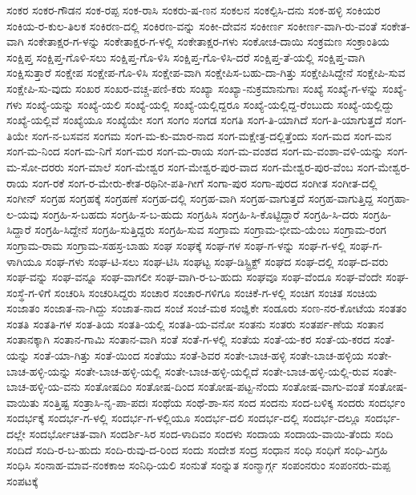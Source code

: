 ಸಂಕರ
ಸಂಕರ-ಗೌಡನ
ಸಂಕ-ರಪ್ಪ
ಸಂಕ-ರಾಸಿ
ಸಂಕರು-ಷ-ಣನ
ಸಂಕಲನ
ಸಂಕಲ್ಪಿಸಿ-ದನು
ಸಂಕ-ಹಳ್ಳಿ
ಸಂಕಿಯರ
ಸಂಕಿಯ-ರ-ಕುಲ-ತಿಲಕ
ಸಂಕಿರಣ-ದಲ್ಲಿ
ಸಂಕಿರಣ-ವನ್ನು
ಸಂಕೀ-ದೇವನ
ಸಂಕೀರ್ಣ
ಸಂಕೀರ್ಣ-ವಾಗಿ-ರು-ವಂತೆ
ಸಂಕೇತ-ವಾಗಿ
ಸಂಕೇತಾಕ್ಷರ-ಗ-ಳನ್ನು
ಸಂಕೇತಾಕ್ಷರ-ಗ-ಳಲ್ಲಿ
ಸಂಕೇತಾಕ್ಷರ-ಗಳು
ಸಂಕೋಚ-ದಾಯಿ
ಸಂಕ್ರಮಣ
ಸಂಕ್ರಾಂತಿಯ
ಸಂಕ್ಷಿಪ್ತ
ಸಂಕ್ಷಿಪ್ತ-ಗೊಳಿ-ಸಲು
ಸಂಕ್ಷಿಪ್ತ-ಗೊ-ಳಿಸಿ
ಸಂಕ್ಷಿಪ್ತ-ಗೊ-ಳಿಸಿ-ದರೆ
ಸಂಕ್ಷಿಪ್ತ-ತೆ-ಯಲ್ಲಿ
ಸಂಕ್ಷಿಪ್ತ-ವಾಗಿ
ಸಂಕ್ಷಿಸುತ್ತಾರೆ
ಸಂಕ್ಷೇಪ
ಸಂಕ್ಷೇಪ-ಗೊ-ಳಿಸಿ
ಸಂಕ್ಷೇಪ-ವಾಗಿ
ಸಂಕ್ಷೇಪಿಸ-ಬಹು-ದಾ-ಗಿತ್ತು
ಸಂಕ್ಷೇಪಿಸಿದ್ದೇನೆ
ಸಂಕ್ಷೇಪಿ-ಸುವ
ಸಂಕ್ಷೇಪಿ-ಸು-ವುದು
ಸಂಖರ
ಸಂಖರ-ವಚ್ಚ-ಪಣಿ-ಕರು
ಸಂಖ್ಯಾ
ಸಂಖ್ಯಾ-ನುಕ್ರಮಾನುಗಾಃ
ಸಂಖ್ಯೆ
ಸಂಖ್ಯೆ-ಗ-ಳನ್ನು
ಸಂಖ್ಯೆ-ಗಳು
ಸಂಖ್ಯೆ-ಯನ್ನು
ಸಂಖ್ಯೆ-ಯಲಿ
ಸಂಖ್ಯೆ-ಯಲ್ಲಿ
ಸಂಖ್ಯೆ-ಯಲ್ಲಿದ್ದರೂ
ಸಂಖ್ಯೆ-ಯಲ್ಲಿದ್ದ-ರೆಂಬುದು
ಸಂಖ್ಯೆ-ಯಲ್ಲಿದ್ದು
ಸಂಖ್ಯೆ-ಯಲ್ಲಿವೆ
ಸಂಖ್ಯೆಯೂ
ಸಂಖ್ಯೆಯೇ
ಸಂಗ
ಸಂಗಂ
ಸಂಗಡ
ಸಂಗತಿ
ಸಂಗ-ತಿ-ಯಾಗಿದೆ
ಸಂಗ-ತಿ-ಯಾಗುತ್ತದೆ
ಸಂಗ-ತಿಯೇ
ಸಂಗ-ನ-ಬಸವನ
ಸಂಗಮ
ಸಂಗ-ಮ-ಕು-ಮಾರ-ನಾದ
ಸಂಗ-ಮಕ್ಷೇತ್ರ-ದಲ್ಲಿತ್ತೆಂದು
ಸಂಗ-ಮದ
ಸಂಗ-ಮನ
ಸಂಗ-ಮ-ನಿಂದ
ಸಂಗ-ಮ-ನಿಗೆ
ಸಂಗ-ಮರ
ಸಂಗ-ಮ-ರಾಯ
ಸಂಗ-ಮ-ವಂಶದ
ಸಂಗ-ಮ-ವಂಶಾ-ವಳಿ-ಯನ್ನು
ಸಂಗ-ಮ-ಸೋ-ದರರು
ಸಂಗ-ಮಾಲೆ
ಸಂಗ-ಮೇಶ್ವರ
ಸಂಗ-ಮೇಶ್ವರ-ಪುರ-ವಾದ
ಸಂಗ-ಮೇಶ್ವರ-ಪುರ-ವೆಂಬ
ಸಂಗ-ಮೇಶ್ವರ-ರಾಯ
ಸಂಗ-ರಕೆ
ಸಂಗ-ರ-ಮೇರು-ಕೇತ-ರಥಿನೀ-ಪತಿ-ಗೀಗೆ
ಸಂಗಾ-ಪುರ
ಸಂಗಾ-ಪುರದ
ಸಂಗೀತ
ಸಂಗೀತ-ದಲ್ಲಿ
ಸಂಗೀನ್
ಸಂಗ್ರಹ
ಸಂಗ್ರಹಕ್ಕೆ
ಸಂಗ್ರಹಣೆ
ಸಂಗ್ರಹ-ದಲ್ಲಿ
ಸಂಗ್ರಹ-ವಾಗಿ
ಸಂಗ್ರಹ-ವಾಗುತ್ತದೆ
ಸಂಗ್ರಹ-ವಾಗುತ್ತಿದ್ದ
ಸಂಗ್ರಹಾ-ಲ-ಯವು
ಸಂಗ್ರಹಿ-ಸ-ಬಹದು
ಸಂಗ್ರಹಿ-ಸ-ಬ-ಹುದು
ಸಂಗ್ರಹಿಸಿ
ಸಂಗ್ರಹಿ-ಸಿ-ಕೊಟ್ಟಿದ್ದಾರೆ
ಸಂಗ್ರಹಿ-ಸಿ-ದರು
ಸಂಗ್ರಹಿ-ಸಿದ್ದಾರೆ
ಸಂಗ್ರಹಿ-ಸಿದ್ದೇನೆ
ಸಂಗ್ರಹಿ-ಸುತ್ತಿದ್ದರು
ಸಂಗ್ರಹಿ-ಸುವ
ಸಂಗ್ರಾಮ
ಸಂಗ್ರಾಮ-ಭೀಮ-ಯೆಂಬ
ಸಂಗ್ರಾಮ-ರಂಗ
ಸಂಗ್ರಾಮ-ರಾಮ
ಸಂಗ್ರಾಮ-ಸಹಸ್ರ-ಬಾಹು
ಸಂಘ
ಸಂಘಕ್ಕೆ
ಸಂಘ-ಗಳ
ಸಂಘ-ಗ-ಳನ್ನು
ಸಂಘ-ಗ-ಳಲ್ಲಿ
ಸಂಘ-ಗ-ಳಾಗಿಯೂ
ಸಂಘ-ಗಳು
ಸಂಘ-ಟಿ-ಸಲು
ಸಂಘ-ಟಿಸಿ
ಸಂಘಟ್ಟ
ಸಂಘ-ಡಿಸ್ಟ್ರಿಕ್ಟ್
ಸಂಘದ
ಸಂಘ-ದಲ್ಲಿ
ಸಂಘ-ದ-ವರು
ಸಂಘ-ವನ್ನು
ಸಂಘ-ವನ್ನೂ
ಸಂಘ-ವಾಗಲೀ
ಸಂಘ-ವಾಗಿ-ರ-ಬ-ಹುದು
ಸಂಘವೂ
ಸಂಘ-ವೆಂದೂ
ಸಂಘ-ವೆಂದೇ
ಸಂಘ-ಸಂಸ್ಥೆ-ಗ-ಳಿಗೆ
ಸಂಚರಿಸಿ
ಸಂಚರಿಸಿದ್ದರು
ಸಂಚಾರ
ಸಂಚಾರ-ಗಳಿಗೂ
ಸಂಚಿಕೆ-ಗ-ಳಲ್ಲಿ
ಸಂಚಿಗ
ಸಂಚಿತ
ಸಂಚಿಯ
ಸಂಜಾತಂ
ಸಂಜಾತ-ನಾ-ಗಿದ್ದು
ಸಂಜಾತ-ನಾದ
ಸಂಜೆ
ಸಂಜೆ-ಮಠ
ಸಂಜ್ಞಿಕೇ
ಸಂಡೂರು
ಸಂಣ-ನರ-ಕೋಟೆಯ
ಸಂತತಂ
ಸಂತತಿ
ಸಂತತಿ-ಗಳ
ಸಂತ-ತಿಯ
ಸಂತತಿ-ಯಲ್ಲಿ
ಸಂತತಿ-ಯ-ವನೋ
ಸಂತನು
ಸಂತರು
ಸಂತರ್ಪ-ಣೆಯ
ಸಂತಾನ
ಸಂತಾನಕ್ಕಾಗಿ
ಸಂತಾನ-ಗಾಮಿ
ಸಂತಾನ-ವಾಗಿ
ಸಂತೆ
ಸಂತೆ-ಗ-ಳಲ್ಲಿ
ಸಂತೆಯ
ಸಂತೆ-ಯ-ಕರ
ಸಂತೆ-ಯ-ಕರದ
ಸಂತೆ-ಯನ್ನು
ಸಂತೆ-ಯಾ-ಗಿತ್ತು
ಸಂತೆ-ಯಿಂದ
ಸಂತೆಯು
ಸಂತೆ-ಶಿವರ
ಸಂತೇ-ಬಾಚ-ಹಳ್ಳಿ
ಸಂತೇ-ಬಾಚ-ಹಳ್ಳಿಯ
ಸಂತೇ-ಬಾಚ-ಹಳ್ಳಿ-ಯನ್ನು
ಸಂತೇ-ಬಾಚ-ಹಳ್ಳಿ-ಯಲ್ಲಿ
ಸಂತೇ-ಬಾಚ-ಹಳ್ಳಿ-ಯಲ್ಲಿದೆ
ಸಂತೇ-ಬಾಚ-ಹಳ್ಳಿ-ಯಲ್ಲಿ-ರುವ
ಸಂತೇ-ಬಾಚ-ಹಳ್ಳಿ-ಯ-ವನು
ಸಂತೋಷದಿಂ
ಸಂತೋಷ-ದಿಂದ
ಸಂತೋಷ-ಪಟ್ಟ-ನೆಂದು
ಸಂತೋಷ-ವಾಗು-ವಂತೆ
ಸಂತೋಷ-ವಾಯಿತು
ಸಂತ್ತಿಷ್ಟ
ಸಂತ್ರಾಸಿ-ನೃ-ಪಾ-ಪದಃ
ಸಂಥೆಯ
ಸಂಥೆ-ಶಾ-ಸನ
ಸಂದ
ಸಂದನು
ಸಂದ-ಬಳಿಕ್ಕ
ಸಂದರು
ಸಂದರ್ಭಂ
ಸಂದರ್ಭಕ್ಕೆ
ಸಂದರ್ಭ-ಗ-ಳಲ್ಲಿ
ಸಂದರ್ಭ-ಗ-ಳಲ್ಲಿಯೂ
ಸಂದರ್ಭ-ದಲಿ
ಸಂದರ್ಭ-ದಲ್ಲಿ
ಸಂದರ್ಭ-ದಲ್ಲೂ
ಸಂದರ್ಭ-ದಲ್ಲೇ
ಸಂದರ್ಭೋಚಿತ-ವಾಗಿ
ಸಂದರ್ಶಿ-ಸಿರ
ಸಂದ-ಳಾದಿವಂ
ಸಂದಳು
ಸಂದಾಯ
ಸಂದಾಯ-ವಾಯಿ-ತೆಂದು
ಸಂದಿ
ಸಂದಿದೆ
ಸಂದಿ-ರ-ಬ-ಹುದು
ಸಂದಿ-ರುವು-ದ-ರಿಂದ
ಸಂದು
ಸಂದೇಶ
ಸಂದ್ರ
ಸಂಧಾನ
ಸಂಧಿ
ಸಂಧಿಗೆ
ಸಂಧಿ-ವಿಗ್ರಹಿ
ಸಂಧಿಸಿ
ಸಂನಾಹ-ಮಾವ-ನಂಕಕಾಱ
ಸಂನಿಧಿ-ಯಲಿ
ಸಂನುತೆ
ಸಂನ್ನುತ
ಸಂನ್ಮಾರ್ಗ್ಗ
ಸಂಪಂನರುಂ
ಸಂಪಂನರು-ಮಪ್ಪ
ಸಂಪಟಕ್ಕೆ
